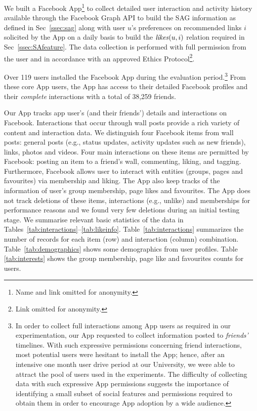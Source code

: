 
We built a Facebook App\footnote{Name and link omitted
for anonymity.} to collect detailed user
interaction and activity history available through the Facebook Graph
API to build the SAG information as defined in Sec~\ref{ssec:sag}
along with user $u$'s preferences on recommended links $i$ solicited by the App on a daily basis
to build the $\likes(u,i)$ relation required in Sec~\ref{ssec:SAfeature}.
The data collection is performed with full permission from the user and in
accordance with an approved Ethics Protocol\footnote{Link omitted for
anonymity.}.

Over 119 users installed the Facebook App during the evaluation
period.\footnote{In order to collect full interactions among App users
as required in our experimentation, our App requested to collect
information posted to \emph{friends'} timelines.  With such expressive
permissions concerning friend interactions, most potential users were
hesitant to install the App; hence, after an intensive one month user drive period
at our University, we were able to attract the pool of users used in the experiments.  The difficulty
of collecting data with such expressive App permissions suggests the importance
of identifying a small subset of social features and permissions required to 
obtain them in order to encourage App adoption by a wide audience.}
From these core App users, the App has access to their detailed
Facebook profiles and their \emph{complete} interactions with a total of 38,259
friends.

Our App tracks app user's (and their friends') details and
interactions on Facebook.  Interactions that occur through wall posts
provide a rich variety of content and interaction data.  We
distinguish four Facebook items from wall posts: general posts (e.g.,
status updates, activity updates such as new friends), links, photos
and videos. Four main interactions on these items are permitted by
Facebook: posting an item to a friend's wall, commenting, liking, and
tagging. Furthermore, Facebook allows user to interact with entities
(groups, pages and favourites) via membership and liking. The App also
keep tracks of the information of user's group membership, page likes
and favourites.  The App does not track deletions of these items,
interactions (e.g., unlike) and memberships for performance reasons
and we found very few deletions during an initial testing stage.  We
summarise relevant basic statistics of the data in
Tables~\ref{tab:interactions}--\ref{tab:likeinfo}.
Table~\ref{tab:interactions} summarizes the number of records for each
item (row) and interaction (column)
combination. Table~\ref{tab:demographics} shows some demographics from
user profiles. Table \ref{tab:interests} shows the group membership,
page like and favourites counts for users.

